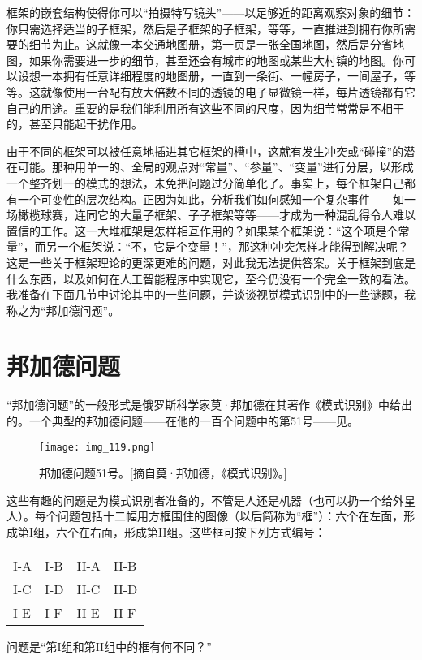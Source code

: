 框架的嵌套结构使得你可以“拍摄特写镜头”——以足够近的距离观察对象的细节：你只需选择适当的子框架，然后是子框架的子框架，等等，一直推进到拥有你所需要的细节为止。这就像一本交通地图册，第一页是一张全国地图，然后是分省地图，如果你需要进一步的细节，甚至还会有城市的地图或某些大村镇的地图。你可以设想一本拥有任意详细程度的地图册，一直到一条街、一幢房子，一间屋子，等等。这就像使用一台配有放大倍数不同的透镜的电子显微镜一样，每片透镜都有它自己的用途。重要的是我们能利用所有这些不同的尺度，因为细节常常是不相干的，甚至只能起干扰作用。

由于不同的框架可以被任意地插进其它框架的槽中，这就有发生冲突或“碰撞”的潜在可能。那种用单一的、全局的观点对“常量”、“参量”、“变量”进行分层，以形成一个整齐划一的模式的想法，未免把问题过分简单化了。事实上，每个框架自己都有一个可变性的层次结构。正因为如此，分析我们如何感知一个复杂事件——如一场橄榄球赛，连同它的大量子框架、子子框架等等——才成为一种混乱得令人难以置信的工作。这一大堆框架是怎样相互作用的？如果某个框架说：“这个项是个常量”，而另一个框架说：“不，它是个变量！”，那这种冲突怎样才能得到解决呢？这是一些关于框架理论的更深更难的问题，对此我无法提供答案。关于框架到底是什么东西，以及如何在人工智能程序中实现它，至今仍没有一个完全一致的看法。我准备在下面几节中讨论其中的一些问题，并谈谈视觉模式识别中的一些谜题，我称之为“邦加德问题”。

\section{邦加德问题}

“邦加德问题”的一般形式是俄罗斯科学家莫·邦加德在其著作《模式识别》中给出的。一个典型的邦加德问题——在他的一百个问题中的第51号——见。

\begin{figure}
\texttt{[image: img\_119.png]}
\caption[邦加德问题51号。]
  {邦加德问题51号。[摘自莫·邦加德，《模式识别》。]}
\end{figure}

这些有趣的问题是为模式识别者准备的，不管是人还是机器（也可以扔一个给外星人）。每个问题包括十二幅用方框围住的图像（以后简称为“框”）：六个在左面，形成第I组，六个在右面，形成第II组。这些框可按下列方式编号：
\begin{center}
\begin{tabular}{ll!{\qquad}ll}
I-A&I-B&II-A&II-B\\
I-C&I-D&II-C&II-D\\
I-E&I-F&II-E&II-F
\end{tabular}
\end{center}
问题是“第I组和第II组中的框有何不同？”

